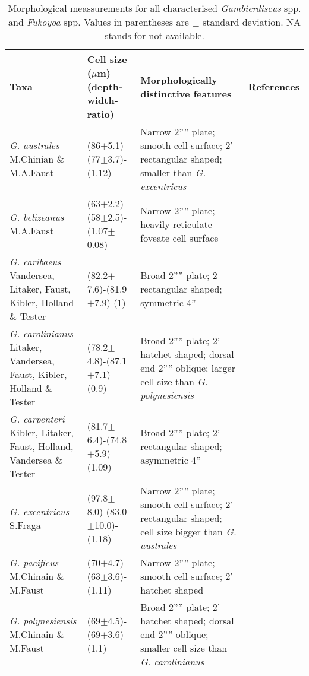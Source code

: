 \documentclass[12pt]{article}
\begin{document}
\FloatBarrier
\begin{longtable}{ | p{5cm} | p{2cm} | p{6cm} | p{2cm} |}
\caption{Morphological meassurements for all characterised \emph{Gambierdiscus} spp. and \emph{Fukoyoa} spp. Values in parentheses are $\pm$ standard deviation. NA stands for not available.}\\
\hline
\label{tbl:GlobalSizeTable}
\textbf{Taxa} &  Cell size ($\mu$m) (depth-width-ratio) & Morphologically distinctive features & References  \\
 \hline
\textit{G. australes }M.Chinian \& M.A.Faust	& (86$\pm$5.1)-(77$\pm$3.7)-(1.12) &  Narrow 2'''' plate; smooth cell surface; 2’ rectangular shaped; smaller than \textit{G. excentricus} & \citep{litaker2009taxonomy,chinain1999morphology}  \\
 \hline
 \textit{G. belizeanus }M.A.Faust	& (63$\pm$2.2)-(58$\pm$2.5)-(1.07$\pm$0.08) & Narrow 2'''' plate; heavily reticulate-foveate cell surface & \citep{chinain1999morphology,litaker2009taxonomy,faust1995observation} \\
 \hline
 \textit{G. caribaeus} Vandersea, Litaker, Faust, Kibler, Holland \& Tester	& (82.2$\pm$7.6)-(81.9$\pm$7.9)-(1) & Broad 2'''' plate; 2 rectangular shaped; symmetric 4'' & \citep{litaker2009taxonomy}  \\
 \hline
 \textit{G. carolinianus} Litaker, Vandersea, Faust, Kibler, Holland \& Tester & (78.2$\pm$4.8)-(87.1$\pm$7.1)-(0.9) & Broad 2'''' plate; 2' hatchet shaped; dorsal end 2'''' oblique; larger cell size than \textit{G. polynesiensis} & \citep{litaker2009taxonomy} \\
 \hline
\textit{G. carpenteri} Kibler, Litaker, Faust, Holland, Vandersea \& Tester &	(81.7$\pm$6.4)-(74.8$\pm$5.9)-(1.09) & Broad 2'''' plate; 2' rectangular shaped; asymmetric 4” & \citep{litaker2009taxonomy}  \\
 \hline
\textit{G. excentricus	}S.Fraga & (97.8$\pm$8.0)-(83.0$\pm$10.0)-(1.18) & Narrow 2'''' plate; smooth cell surface; 2' rectangular shaped; cell size bigger than \textit{G. australes} & \citep{litaker2009taxonomy} \\
 \hline
\textit{G. pacificus} M.Chinain \& M.Faust& (70$\pm$4.7)-(63$\pm$3.6)-(1.11) & Narrow 2'''' plate; smooth cell surface; 2’ hatchet shaped & \citep{chinain1999morphology,litaker2009taxonomy} \\
 \hline
\textit{G. polynesiensis} M.Chinain \& M.Faust & (69$\pm$4.5)-(69$\pm$3.6)-(1.1) & Broad 2'''' plate; 2' hatchet shaped; dorsal end 2'''' oblique; smaller cell size than \textit{G. carolinianus} &	\citep{chinain1999morphology,litaker2009taxonomy} \\ 

\end{longtable}
\end{document}
